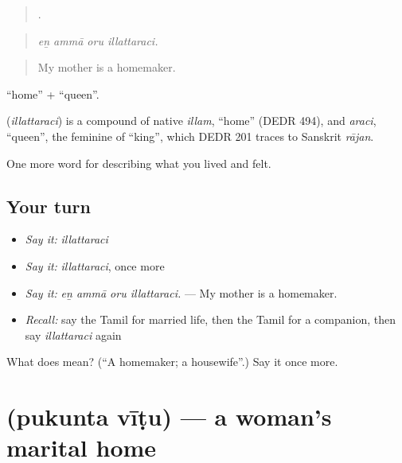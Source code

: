 \begin{quote}
   .
\end{quote}

\begin{quote}
\emph{eṉ ammā oru illattaraci.}
\end{quote}

\begin{quote}
My mother is a homemaker.
\end{quote}

 \textquotedblleft{}home\textquotedblright{} +  \textquotedblleft{}queen\textquotedblright{}.

\begin{cousinweb}
\textbf{} (\emph{illattaraci}) is a compound of native  \emph{illam}, \textquotedblleft{}home\textquotedblright{} (DEDR 494), and  \emph{araci}, \textquotedblleft{}queen\textquotedblright{}, the feminine of  \textquotedblleft{}king\textquotedblright{}, which DEDR 201 traces to Sanskrit \emph{rājan}.
\end{cousinweb}

\begin{grammarlens}[title={What you've built}]
One more word for describing what you lived and felt.
\end{grammarlens}

\subsection*{Your turn}
\begin{itemize}
\raggedright
  \item \emph{Say it:} \emph{illattaraci}
  \item \emph{Say it:} \emph{illattaraci}, once more
  \item \emph{Say it:} \emph{eṉ ammā oru illattaraci.} — My mother is a homemaker.
  \item \emph{Recall:} say the Tamil for married life, then the Tamil for a companion, then say \emph{illattaraci} again
\end{itemize}

\begin{tcolorbox}[breakable,colback=teal!4,colframe=teal!35!black,title={Before you move on}]
What does  mean? (\textquotedblleft{}A homemaker; a housewife\textquotedblright{}.) Say it once more.
\end{tcolorbox}
\section[\texorpdfstring{\ta{புகுந்த} \ta{வீடு} (pukunta vīṭu)}{புகுந்த வீடு (pukunta vīṭu)}]{  (pukunta vīṭu) — a woman’s marital home}

